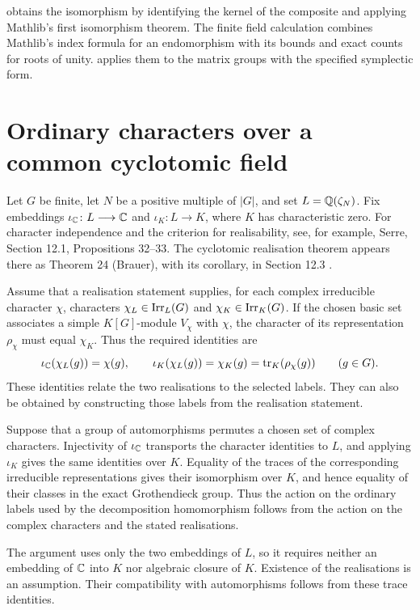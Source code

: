 \begin{implementation}
 obtains the isomorphism
by identifying the kernel of the composite and applying Mathlib's first
isomorphism theorem. The finite field calculation combines Mathlib's
index formula for an endomorphism with its bounds and exact counts for
roots of unity.
 applies them to the
matrix groups with the specified symplectic form.
\end{implementation}

\section{Ordinary characters over a common cyclotomic field}

Let $G$ be finite, let $N$ be a positive multiple of $|G|$, and set
$L=\mathbb Q(\zeta_N)$. Fix embeddings $\iota_{\mathbb C}\colon L\longrightarrow\mathbb C$
and $\iota_K\colon L\longrightarrow K$, where $K$ has characteristic
zero. For character independence and the criterion for realisability,
see, for example, Serre, Section 12.1, Propositions 32--33. The cyclotomic
realisation theorem appears there as Theorem 24 (Brauer), with its
corollary, in Section 12.3 \cite{Serre1977}.

Assume that a realisation statement supplies, for each complex
irreducible character $\chi$, characters $\chi_L\in\operatorname{Irr}_L(G)$ and
$\chi_K\in\operatorname{Irr}_K(G)$. If the chosen basic set associates a simple $K[G]$-module $V_\chi$ with
$\chi$, the character of its representation $\rho_\chi$ must equal $\chi_K$. Thus the required identities are
\[
 \iota_{\mathbb C}(\chi_L(g))=\chi(g),\qquad
 \iota_K(\chi_L(g))=\chi_K(g)=\operatorname{tr}_K(\rho_\chi(g))
 \qquad(g\in G).
\]
These identities relate the two realisations to the selected labels.
They can also be obtained by constructing those labels from the
realisation statement.

Suppose that a group of automorphisms permutes a chosen set of complex
characters. Injectivity of $\iota_{\mathbb C}$ transports the character
identities to $L$, and applying $\iota_K$ gives the same identities
over $K$. Equality of the traces of the corresponding irreducible
representations gives their isomorphism over $K$, and hence equality
of their classes in the exact Grothendieck group. Thus the action on
the ordinary labels used by the decomposition homomorphism follows
from the action on the complex characters and the stated realisations.

The argument uses only the two embeddings of $L$, so it requires neither
an embedding of $\mathbb C$ into $K$ nor algebraic closure of $K$.
Existence of the realisations is an assumption. Their compatibility with
automorphisms follows from these trace identities.

